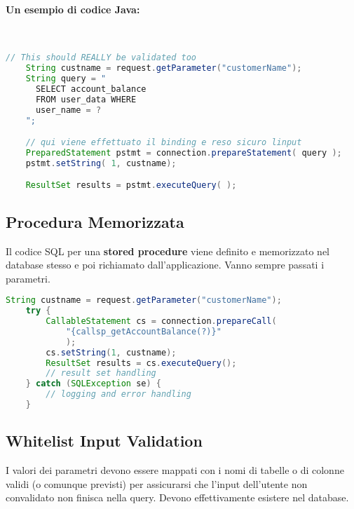 \paragraph{Un esempio di codice Java:} \

\begin{lstlisting}[language=Java]
    // This should REALLY be validated too
    String custname = request.getParameter("customerName");
    String query = "
      SELECT account_balance 
      FROM user_data WHERE
      user_name = ? 
    ";

    // qui viene effettuato il binding e reso sicuro linput
    PreparedStatement pstmt = connection.prepareStatement( query );
    pstmt.setString( 1, custname);

    ResultSet results = pstmt.executeQuery( );
\end{lstlisting}

\subsection{Procedura Memorizzata}

Il codice SQL per una \textbf{stored procedure} viene definito e memorizzato nel
database stesso e
poi richiamato dall'applicazione. Vanno sempre passati i parametri.

\begin{lstlisting}[language=Java, caption=Esempio di codice Java che
    sfrutta una \textit{stored procedure}]
    String custname = request.getParameter("customerName");
    try {
        CallableStatement cs = connection.prepareCall(
            "{callsp_getAccountBalance(?)}"
            );
        cs.setString(1, custname);
        ResultSet results = cs.executeQuery();
        // result set handling
    } catch (SQLException se) {
        // logging and error handling
    }
\end{lstlisting}

\subsection{Whitelist Input Validation}

I valori dei parametri devono essere mappati con i nomi di tabelle o di colonne
validi (o comunque previsti) per assicurarsi che l'input dell'utente non
convalidato non finisca nella
query. Devono effettivamente esistere nel database.

